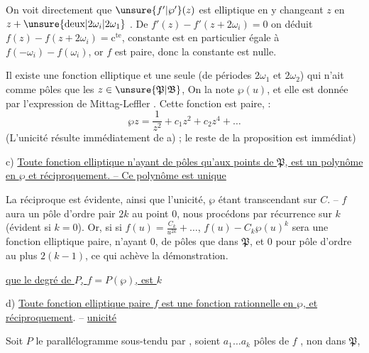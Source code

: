 On voit directement que $\unsure{f'|\wp'}(z)$ est elliptique en y changeant $z$ en $z+\unsure{\text{deux}|2\omega_i|2\omega_1}$ . De $f'(z)-f'(z+2\omega_i)=0$ on déduit $f(z)-f(z+2\omega_i)=\mathrm{c}^{\mathrm{te}}$,  constante est en particulier égale à $f(-\omega_i)-f(\omega_i)$, or $f$ est paire, donc la constante est nulle. 

Il existe une fonction elliptique et une seule (de périodes $2\omega_1$ et $2\omega_2$) qui n'ait comme pôles que les $z\in\unsure{\mathfrak P|\mathfrak B}$,   On la note $\wp(u)$, et elle est donnée par l'expression de Mittag-Leffler . Cette fonction est paire,  :
\[
\wp z=\frac1{z^2}+c_1z^2+c_2z^4+\ldots
\]
(L'unicité résulte immédiatement de a) ; le reste de la proposition est immédiat)

c) \uline{Toute fonction elliptique   n'ayant de pôles qu'aux points de $\mathfrak P$, est un polynôme en $\wp$ \deleted{\unsure{,}} et réciproquement. -- Ce polynôme est unique}

La réciproque est évidente, ainsi que l'unicité, $\wp$ étant transcendant sur $C$. -- $f$ aura un pôle d'ordre pair $2k$ au point $0$, nous procédons par récurrence sur $k$ (évident si $k=0$). Or, si  si $f(u)=\frac{C_k}{u^{2k}}+\ldots$, $f(u)-C_k\wp(u)^k$ sera  une fonction elliptique paire, n'ayant  $0$, de pôles que dans $\mathfrak P$, et $0$ pour pôle d'ordre au plus $2(k-1)$, ce qui achève la démonstration.

\uline{ que le degré de $P$,  $f=P(\wp)$, est $k$}

d) \uline{Toute fonction elliptique paire $f$ est une fonction rationnelle en $\wp$, et réciproquement}. -- \uline{unicité}

Soit $P$ le parallélogramme sous-tendu par , soient $a_1\ldots a_k$   pôles de $f$ , non dans $\mathfrak P$, 

